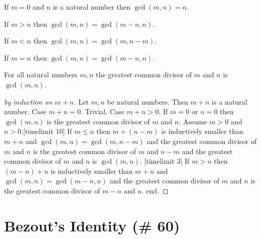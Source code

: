 \documentclass{article}
\begin{document}
\begin{forthel}
\begin{axiom}
If $m=0$ and $n$ is a natural number then $\gcd(m,n)=n$.
\end{axiom}
\begin{axiom}
If $m > n$ then $\gcd(m,n) = \gcd(m-n,n)$.
\end{axiom}
\begin{axiom}
If $m < n$ then $\gcd(m,n) = \gcd(m,n-m)$.
\end{axiom}
\begin{axiom}
If $m = n$ then $\gcd(m,n) = \gcd(m-n,n)$.
\end{axiom}


\begin{proposition}
For all natural numbers $m,n$ the greatest common divisor of $m$ and $n$ is $\gcd(m,n)$.
\end{proposition}
\begin{proof}[by induction on $m+n$]
Let $m,n$ be natural numbers.
Then $m+n$ is a natural number.
Case $m + n =0$. Trivial.
Case $m + n > 0$.
If $m=0$ or $n=0$ then $\gcd(m,n)$ is 
the greatest common divisor of $m$ and $n$.
Assume $m>0$ and $n>0$.[timelimit 10]
If $m \leq n$ then $m + (n-m)$ is inductively smaller than $m + n$ and
$\gcd(m,n) = \gcd(m,n-m)$ and
the greatest common divisor of $m$ and $n$ is 
the greatest common divisor of $m$ and $n-m$
and the greatest common divisor of $m$ and $n$ is $\gcd(m,n)$. [timelimit 3]
If $m > n$ then $(m-n) + n$ is inductively smaller than $m + n$ and
$\gcd(m,n) = \gcd(m-n,n)$ and 
the greatest common divisor of $m$ and $n$ is 
the greatest common divisor of $m-n$ and $n$. end.
\end{proof}
\end{forthel}


\section{Bezout's Identity (\# 60)}
\end{document}
